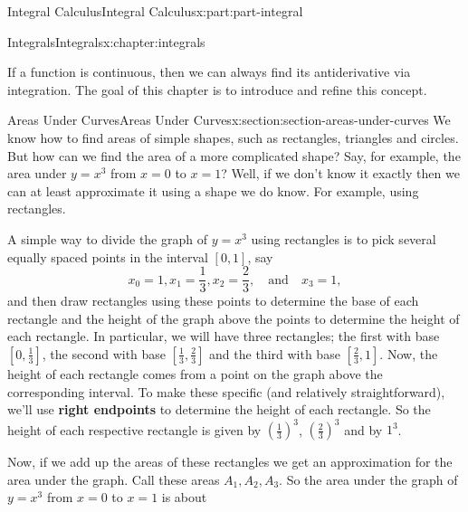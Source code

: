 \documentclass[twoside,10pt,]{tufte-book}
\newcommand{\terminology}[1]{\textbf{#1}}
\numberwithin{equation}{part}
\begin{document}
\begin{partptx}{Integral Calculus}{}{Integral Calculus}{}{}{x:part:part-integral}
%
\typeout{************************************************}
\typeout{************************************************}
%
\begin{chapterptx}{Integrals}{}{Integrals}{}{}{x:chapter:integrals}
\begin{introduction}{}%
If a function is continuous, then we can always find its antiderivative via integration. The goal of this chapter is to introduce and refine this concept.%
\end{introduction}%
%
%
\typeout{************************************************}
\typeout{************************************************}
%
\begin{sectionptx}{Areas Under Curves}{}{Areas Under Curves}{}{}{x:section:section-areas-under-curves}
We know how to find areas of simple shapes, such as rectangles, triangles and circles. But how can we find the area of a more complicated shape? Say, for example, the area under \(y=x^{3}\) from \(x=0\) to \(x=1\)? Well, if we don't know it exactly then we can at least approximate it using a shape we do know. For example, using rectangles.%
\par
A simple way to divide the graph of \(y=x^{3}\) using rectangles is to pick several equally spaced points in the interval \([0,1]\), say%
\begin{equation*}
x_{0} = 1, x_{1} = \frac{1}{3}, x_{2} = \frac{2}{3}, \quad\text{and}\quad x_{3} = 1,
\end{equation*}
and then draw rectangles using these points to determine the base of each rectangle and the height of the graph above the points to determine the height of each rectangle. In particular, we will have three rectangles; the first with base \([0,\frac{1}{3}]\), the second with base \([\frac{1}{3},\frac{2}{3}]\) and the third with base \([\frac{2}{3},1]\). Now, the height of each rectangle comes from a point on the graph above the corresponding interval. To make these specific (and relatively straightforward), we'll use \terminology{right endpoints} to determine the height of each rectangle. So the height of each respective rectangle is given by \((\frac{1}{3})^{3}\), \((\frac{2}{3})^{3}\) and by \(1^{3}\).%
\par
Now, if we add up the areas of these rectangles we get an approximation for the area under the graph. Call these areas \(A_{1},A_{2},A_{3}\). So the area under the graph of \(y = x^{3}\) from \(x=0\) to \(x=1\) is about%

\end{sectionptx}
\end{chapterptx}
\end{partptx}
\end{document}
